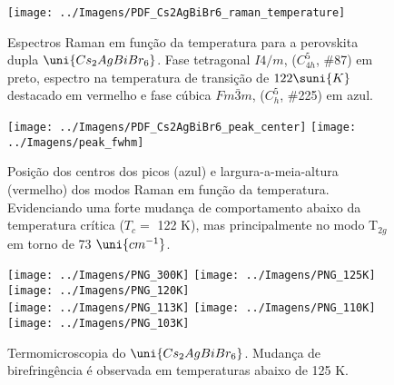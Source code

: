 \begin{figure}[h!]
    \centering
    \texttt{[image: ../Imagens/PDF\_Cs2AgBiBr6\_raman\_temperature]}
    \caption{Espectros Raman em função da temperatura para a perovskita dupla $\uni{Cs_2 Ag Bi Br_6}$. Fase tetragonal $I4/m$, ($C_{4h}^5$, \#87) em preto, espectro na temperatura de transição de $122 \suni{K}$ destacado em vermelho e fase cúbica $Fm \bar{3}m$, ($C_{h}^5$, \#225) em azul.}
    \label{raman_temperature}
\end{figure}

\begin{figure}[h!]
    \centering
	\texttt{[image: ../Imagens/PDF\_Cs2AgBiBr6\_peak\_center]}
	\texttt{[image: ../Imagens/peak\_fwhm]}
    \caption{Posição dos centros dos picos (azul) e largura-a-meia-altura (vermelho) dos modos Raman em função da temperatura. Evidenciando uma forte mudança de comportamento abaixo da temperatura crítica ($T_c =$ 122 K), mas principalmente no modo T$_{2g}$ em torno de 73 $\uni{cm^{-1}}$.}
    \label{peak_center}
\end{figure}

\begin{figure}[ht] \centering
	\texttt{[image: ../Imagens/PNG\_300K]}
	\texttt{[image: ../Imagens/PNG\_125K]}
	\texttt{[image: ../Imagens/PNG\_120K]} \\
	\texttt{[image: ../Imagens/PNG\_113K]}
	\texttt{[image: ../Imagens/PNG\_110K]}
	\texttt{[image: ../Imagens/PNG\_103K]}
	\caption{Termomicroscopia do $\uni{Cs_2 Ag Bi Br_6}$. Mudança de birefringência é observada em temperaturas abaixo de 125 K.}
	\label{termomicroscopia}
\end{figure}

